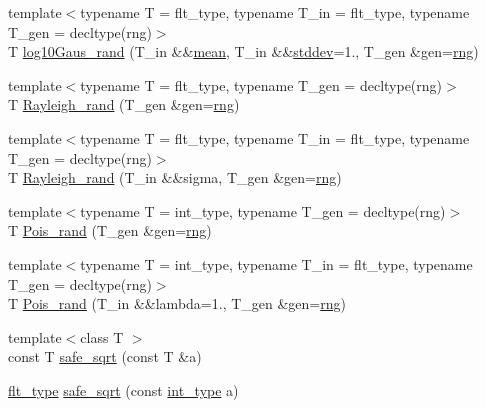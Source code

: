 \begin{DoxyCompactItemize}
\item 
{\footnotesize template$<$typename T  = flt\-\_\-type, typename T\-\_\-in  = flt\-\_\-type, typename T\-\_\-gen  = decltype(rng)$>$ }\\T \hyperlink{namespaceIceBRG_a1bc93f595f23f7e31e7a2b8a721a9d64}{log10\-Gaus\-\_\-rand} (T\-\_\-in \&\&\hyperlink{namespaceIceBRG_a31912d66a78938bcc3e0fdbc917c5eec}{mean}, T\-\_\-in \&\&\hyperlink{namespaceIceBRG_a9db49a32658ae04d4e5780e90c58ae15}{stddev}=1., T\-\_\-gen \&gen=\hyperlink{namespaceIceBRG_a43349d2fe56e49b46f2da45c2472137d}{rng})
\item 
{\footnotesize template$<$typename T  = flt\-\_\-type, typename T\-\_\-gen  = decltype(rng)$>$ }\\T \hyperlink{namespaceIceBRG_ad5beaf7f31c4ecdbabf5c1f1fa0f7f6b}{Rayleigh\-\_\-rand} (T\-\_\-gen \&gen=\hyperlink{namespaceIceBRG_a43349d2fe56e49b46f2da45c2472137d}{rng})
\item 
{\footnotesize template$<$typename T  = flt\-\_\-type, typename T\-\_\-in  = flt\-\_\-type, typename T\-\_\-gen  = decltype(rng)$>$ }\\T \hyperlink{namespaceIceBRG_a9fab2dcec2635a4e59ba071c32da779d}{Rayleigh\-\_\-rand} (T\-\_\-in \&\&sigma, T\-\_\-gen \&gen=\hyperlink{namespaceIceBRG_a43349d2fe56e49b46f2da45c2472137d}{rng})
\item 
{\footnotesize template$<$typename T  = int\-\_\-type, typename T\-\_\-gen  = decltype(rng)$>$ }\\T \hyperlink{namespaceIceBRG_a1c9e722659890cce624c4ce86284b114}{Pois\-\_\-rand} (T\-\_\-gen \&gen=\hyperlink{namespaceIceBRG_a43349d2fe56e49b46f2da45c2472137d}{rng})
\item 
{\footnotesize template$<$typename T  = int\-\_\-type, typename T\-\_\-in  = flt\-\_\-type, typename T\-\_\-gen  = decltype(rng)$>$ }\\T \hyperlink{namespaceIceBRG_a37cc4f8621b4da03b565610c6849aa25}{Pois\-\_\-rand} (T\-\_\-in \&\&lambda=1., T\-\_\-gen \&gen=\hyperlink{namespaceIceBRG_a43349d2fe56e49b46f2da45c2472137d}{rng})
\item 
{\footnotesize template$<$class T $>$ }\\const T \hyperlink{namespaceIceBRG_ad03a73cb47a7f99aa7bef24b52f72d61}{safe\-\_\-sqrt} (const T \&a)
\item 
\hyperlink{lib_2IceBRG__main_2common_8h_ad0f130a56eeb944d9ef2692ee881ecc4}{flt\-\_\-type} \hyperlink{namespaceIceBRG_ae33e2111d94e17405d5b736a7ac159cd}{safe\-\_\-sqrt} (const \hyperlink{lib_2IceBRG__main_2common_8h_ac4de9d9335536ac22821171deec8d39e}{int\-\_\-type} a)

\end{DoxyCompactItemize}
